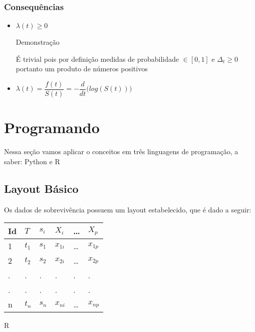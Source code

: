 \documentclass[
  letterpaper,
  DIV=11,
  numbers=noendperiod]{scrreprt}
\providecommand{\tightlist}{%
  \setlength{\itemsep}{0pt}\setlength{\parskip}{0pt}}
\begin{document}
\hypertarget{consequuxeancias}{%
\subsection{Consequências}\label{consequuxeancias}}

\begin{itemize}
\tightlist
\item
  \(\lambda(t) \geq 0\)

  Demonstração

  É trivial pois por definição medidas de probabilidade \(\in [0,1]\) e
  \(\Delta_t \geq 0\) portanto um produto de números positivos
\item
  \(\lambda(t) =\dfrac{f(t)}{S(t)} = -\dfrac{d}{dt}\bigg(log(S(t))\bigg)\)
\end{itemize}

\hypertarget{programando}{%
\chapter{Programando}\label{programando}}

Nessa seção vamos aplicar o conceitos em três linguagens de programação,
a saber: Python e R

\hypertarget{layout-buxe1sico}{%
\section{Layout Básico}\label{layout-buxe1sico}}

Os dados de sobrevivência possuem um layout estabelecido, que é dado a
seguir:

\begin{longtable}[]{@{}llllll@{}}
\toprule()
Id & \(T\) & \(s_i\) & \(X_i\) & \ldots{} & \(X_p\) \\
\midrule()
\endhead
1 & \(t_1\) & \(s_1\) & \(x_{1i}\) & \ldots{} & \(x_{1p}\) \\
2 & \(t_2\) & \(s_2\) & \(x_{2i}\) & \ldots{} & \(x_{2p}\) \\
. & . & . & . & . & . \\
. & . & . & . & . & . \\
n & \(t_n\) & \(s_n\) & \(x_{ni}\) & \ldots{} & \(x_{np}\) \\
\bottomrule()
\end{longtable}

R
\end{document}
